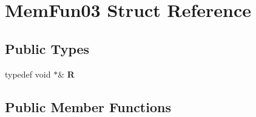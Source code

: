 \hypertarget{struct_mem_fun03}{}\section{Mem\+Fun03 Struct Reference}
\label{struct_mem_fun03}
\subsection*{Public Types}
\begin{DoxyCompactItemize}
\item 
\mbox{\label{struct_mem_fun03_af352e613359a1f4838cd90abaf2d66f7}} 
typedef void $\ast$\& {\bfseries R}
\end{DoxyCompactItemize}
\subsection*{Public Member Functions}
